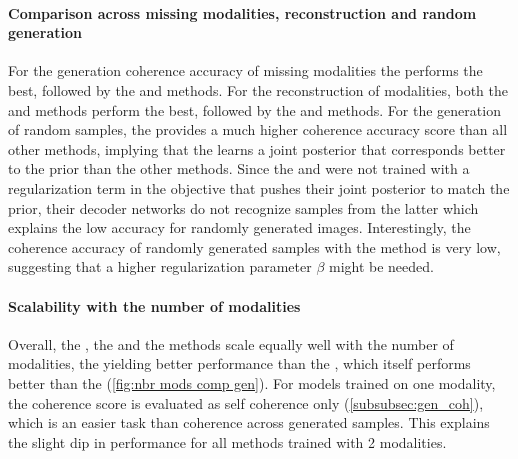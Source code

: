 \paragraph{Comparison across missing modalities, reconstruction and random generation}
For the generation coherence accuracy of missing modalities the  performs the best, followed by the  and  methods.
For the reconstruction of modalities, both the  and  methods perform the best, followed by the  and  methods.
For the generation of random samples, the  provides a much higher coherence accuracy score than all other methods, implying that the  learns a joint posterior that corresponds better to the prior than the other methods.
Since the  and  were not trained with a regularization term in the objective that pushes their joint posterior to match the prior, their decoder networks do not recognize samples from the latter which explains the low accuracy for randomly generated images.
Interestingly, the coherence accuracy of randomly generated samples with the  method is very low, suggesting that a higher regularization parameter $\beta$ might be needed.

\paragraph{Scalability with the number of modalities}
Overall, the , the  and the  methods scale equally well with the number of modalities, the  yielding better performance than the , which itself performs better than the  (\cref{fig:nbr mods comp gen}).
For models trained on one modality, the coherence score is evaluated as self coherence only (\cref{subsubsec:gen_coh}), which is an easier task than coherence across generated samples.
This explains the slight dip in performance for all methods trained with 2 modalities.


